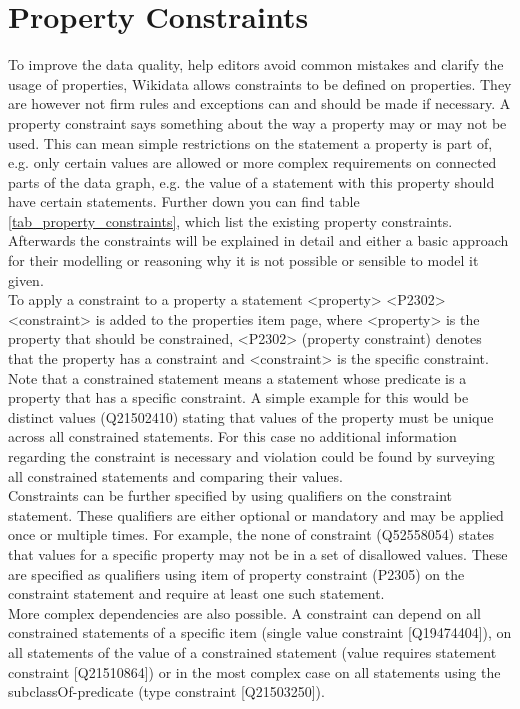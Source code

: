 \documentclass[hyperref,bachelorofscience,fleqn]{cgvpub}
\begin{document}
\chapter{Property Constraints}

To improve the data quality, help editors avoid common mistakes and clarify the usage of properties, Wikidata allows constraints to be defined on properties. They are however not firm rules and exceptions can and should be made if necessary. A property constraint says something about the way a property may or may not be used. This can mean simple restrictions on the statement a property is part of, e.g. only certain values are allowed or more complex requirements on connected parts of the data graph, e.g. the value of a statement with this property should have certain statements. Further down you can find table \ref{tab_property_constraints}, which list the existing property constraints. Afterwards the constraints will be explained in detail and either a basic approach for their modelling or reasoning why it is not possible or sensible to model it given.\\

To apply a constraint to a property a statement <property> <P2302> <constraint> is added to the properties item page, where <property> is the property that should be constrained, <P2302> (property constraint) denotes that the property has a constraint and <constraint> is the specific constraint. Note that a constrained statement means a statement whose predicate is a property that has a specific constraint. A simple example for this would be distinct values (Q21502410) stating that values of the property must be unique across all constrained statements. For this case no additional information regarding the constraint is necessary and violation could be found by surveying all constrained statements and comparing their values.\\
Constraints can be further specified by using qualifiers on the constraint statement. These qualifiers are either optional or mandatory and may be applied once or multiple times. For example, the none of constraint (Q52558054) states that values for a specific property may not be in a set of disallowed values. These are specified as qualifiers using item of property constraint (P2305) on the constraint statement and require at least one such statement.\\
More complex dependencies are also possible. A constraint can depend on all constrained statements of a specific item (single value constraint [Q19474404]), on all statements of the value of a constrained statement (value requires statement constraint [Q21510864]) or in the most complex case on all statements using the subclassOf-predicate (type constraint [Q21503250]).
\end{document}
